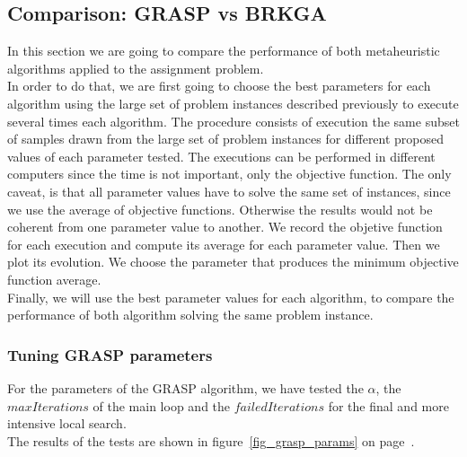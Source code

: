 \subsection{Comparison: GRASP vs BRKGA}

In this section we are going to compare the performance of both metaheuristic algorithms applied to the assignment problem.\\
In order to do that, we are first going to choose the best parameters for each algorithm using the large set of problem instances described previously to execute several times each algorithm. The procedure consists of execution the same subset of samples drawn from the large set of problem instances for different proposed values of each parameter tested. The executions can be performed in different computers since the time is not important, only the objective function. The only caveat, is that all parameter values have to solve the same set of instances, since we use the average of objective functions. Otherwise the results would not be coherent from one parameter value to another. We record the objetive function for each execution and compute its average for each parameter value. Then we plot its evolution. We choose the parameter that produces the minimum objective function average.\\
Finally, we will use the best parameter values for each algorithm, to  compare the performance of both algorithm solving the same problem instance.


\subsubsection{Tuning GRASP parameters}

For the parameters of the GRASP algorithm, we have tested the $\alpha$, the $maxIterations$ of the main loop and the $failedIterations$ for the final and more intensive local search.\\
The results of the tests are shown in figure~\ref{fig_grasp_params} on page~\pageref{fig_grasp_params}.

